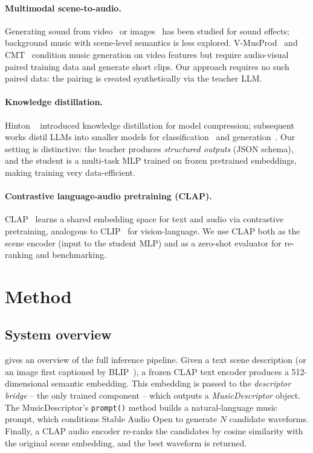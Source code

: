\documentclass[10pt,twocolumn,letterpaper]{article}
\begin{document}
\paragraph{Multimodal scene-to-audio.}
Generating sound from video~\cite{su2023physics, mo2023foleycrafter} or
images~\cite{iashin2021taming} has been studied for sound effects; background
music with scene-level semantics is less explored.
V-MusProd~\cite{zhuo2023video} and CMT~\cite{di2021video} condition music
generation on video features but require audio-visual paired training data and
generate short clips.
Our approach requires no such paired data: the pairing is created synthetically
via the teacher LLM.

\paragraph{Knowledge distillation.}
Hinton \etal~\cite{hinton2015distilling} introduced knowledge distillation for
model compression; subsequent works distil LLMs into smaller models for
classification~\cite{sanh2019distilbert} and
generation~\cite{kim2016sequence}.
Our setting is distinctive: the teacher produces \emph{structured outputs}
(JSON schema), and the student is a multi-task MLP trained on frozen
pretrained embeddings, making training very data-efficient.

\paragraph{Contrastive language-audio pretraining (CLAP).}
CLAP~\cite{elizalde2023clap} learns a shared embedding space for text and
audio via contrastive pretraining, analogous to CLIP~\cite{radford2021clip}
for vision-language.
We use CLAP both as the scene encoder (input to the student MLP) and as a
zero-shot evaluator for re-ranking and benchmarking.

\section{Method}
\label{sec:method}

\subsection{System overview}

 gives an overview of the full inference pipeline.
Given a text scene description (or an image first captioned by
BLIP~\cite{li2022blip}), a frozen CLAP text encoder produces a 512-dimensional
semantic embedding.
This embedding is passed to the \emph{descriptor bridge} -- the only trained
component -- which outputs a \emph{MusicDescriptor} object.
The MusicDescriptor's \texttt{prompt()} method builds a natural-language music
prompt, which conditions Stable Audio Open to generate $N$ candidate waveforms.
Finally, a CLAP audio encoder re-ranks the candidates by cosine similarity
with the original scene embedding, and the best waveform is returned.
\end{document}
